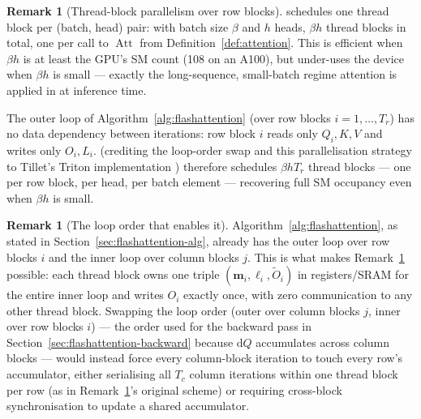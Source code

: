 \documentclass[11pt]{amsart}
\theoremstyle{plain}
\theoremstyle{definition}
\newtheorem{remark}[theorem]{Remark}
\newcommand{\Att}{\operatorname{Att}}
\begin{document}
\begin{remark}[Thread-block parallelism over row blocks]
\label{rem:sequence-parallelism}
\cite{Dao2022} schedules one thread block per (batch, head) pair: with
batch size $\beta$ and $h$ heads, $\beta h$ thread blocks in total, one per
call to $\Att$ from Definition~\ref{def:attention}.  This is efficient when
$\beta h$ is at least the GPU's SM count (108 on an A100), but under-uses
the device when $\beta h$ is small --- exactly the long-sequence,
small-batch regime attention is applied in at inference time.

The outer loop of Algorithm~\ref{alg:flashattention} (over row blocks
$i=1,\ldots,T_r$) has no data dependency between iterations: row block $i$
reads only $Q_i, K, V$ and writes only $O_i, L_i$.  \cite{Dao2023}
(crediting the loop-order swap and this parallelisation strategy to
Tillet's Triton implementation \cite{tillet2019triton}) therefore schedules
$\beta h T_r$ thread blocks --- one per row block, per head, per batch
element --- recovering full SM occupancy even when $\beta h$ is small.
\end{remark}

\begin{remark}[The loop order that enables it]
Algorithm~\ref{alg:flashattention}, as stated in
Section~\ref{sec:flashattention-alg}, already has the outer loop over row
blocks $i$ and the inner loop over column blocks $j$.  This is what makes
Remark~\ref{rem:sequence-parallelism} possible: each thread block owns one
triple $(\mathbf{m}_i,\boldsymbol{\ell}_i,\tilde{O}_i)$ in registers/SRAM for
the entire inner loop and writes $O_i$ exactly once, with zero
communication to any other thread block.  Swapping the loop order (outer
over column blocks $j$, inner over row blocks $i$) --- the order used for
the backward pass in Section~\ref{sec:flashattention-backward} because
$\mathrm{d}Q$ accumulates across column blocks --- would instead force
every column-block iteration to touch every row's accumulator, either
serialising all $T_c$ column iterations within one thread block per row (as
in Remark~\ref{rem:sequence-parallelism}'s original scheme) or requiring
cross-block synchronisation to update a shared accumulator.
\end{remark}
\end{document}

